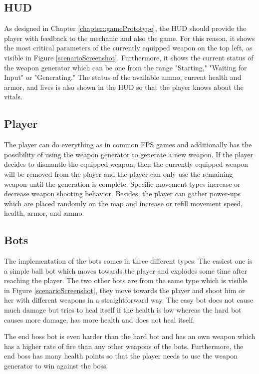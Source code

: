 \documentclass[MGS,Master,english]{twbook}%
\begin{document}
\subsection{\acl{HUD}}
As designed in Chapter \ref{chapter::gamePrototype}, the HUD should provide the player with feedback to the mechanic and also the game. For this reason, it shows the most critical parameters of the currently equipped weapon on the top left, as visible in Figure \ref{scenarioScreenshot}. Furthermore, it shows the current status of the weapon generator which can be one from the range "Starting," "Waiting for Input" or "Generating." The status of the available ammo, current health and armor, and lives is also shown in the HUD so that the player knows about the vitals.

\subsection{Player}
The player can do everything as in common FPS games and additionally has the possibility of using the weapon generator to generate a new weapon. If the player decides to dismantle the equipped weapon, then the currently equipped weapon will be removed from the player and the player can only use the remaining weapon until the generation is complete. Specific movement types increase or decrease weapon shooting behavior. Besides, the player can gather power-ups which are placed randomly on the map and increase or refill movement speed, health, armor, and ammo.

\subsection{Bots}
The implementation of the bots comes in three different types. The easiest one is a simple ball bot which moves towards the player and explodes some time after reaching the player. The two other bots are from the same type  which is visible in Figure \ref{scenarioScreenshot}, they move towards the player and shoot him or her with different weapons in a straightforward way. The easy bot does not cause much damage but tries to heal itself if the health is low whereas the hard bot causes more damage, has more health and does not heal itself.

The end boss bot is even harder than the hard bot and has an own weapon which has a higher rate of fire than any other weapons of the bots. Furthermore, the end boss has many health points so that the player needs to use the weapon generator to win against the boss.
\end{document}
